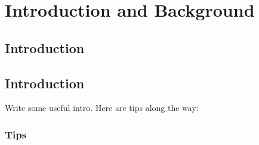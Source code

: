 \documentclass[11pt,
               a4paper,
               bibtotoc,
               idxtotoc,
               headsepline,
               footsepline,
               footexclude,
               BCOR12mm,
               DIV13,
               openany,   %
               ]
               {scrbook}
\begin{document}

\tableofcontents
\thispagestyle{empty}
\cleardoubleemptypage


\mainmatter
\part{Introduction and Background}
\chapter{Introduction}









\chapter{Introduction}
\label{sec:intro}       %
Write some useful intro. Here are tips along the way:

\section{Tips}
\end{document}

